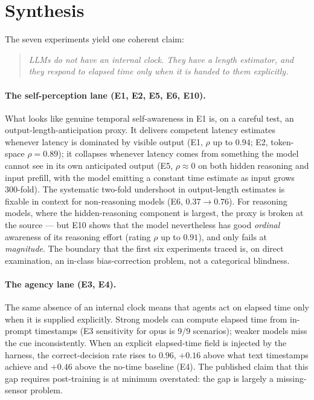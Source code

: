 \documentclass[11pt]{article}
\begin{document}
\section{Synthesis}
\label{sec:synthesis}

The seven experiments yield one coherent claim:

\begin{quote}
\itshape
LLMs do not have an internal clock. They have a length estimator, and they respond to
elapsed time only when it is handed to them explicitly.
\end{quote}

\paragraph{The self-perception lane (E1, E2, E5, E6, E10).} What looks like genuine
temporal self-awareness in E1 is, on a careful test, an output-length-anticipation proxy. It
delivers competent latency estimates whenever latency is dominated by visible output (E1,
$\rho$ up to $0.94$; E2, token-space $\rho = 0.89$); it collapses whenever latency comes from
something the model cannot see in its own anticipated output (E5, $\rho \approx 0$ on both
hidden reasoning and input prefill, with the model emitting a constant time estimate as input
grows $300$-fold). The systematic two-fold undershoot in output-length estimates is fixable in
context for non-reasoning models (E6, $0.37 \to 0.76$). For reasoning models, where the
hidden-reasoning component is largest, the proxy is broken at the source --- but E10 shows
that the model nevertheless has good \emph{ordinal} awareness of its reasoning effort
(rating $\rho$ up to $0.91$), and only fails at \emph{magnitude}. The boundary that the first
six experiments traced is, on direct examination, an in-class bias-correction problem, not a
categorical blindness.

\paragraph{The agency lane (E3, E4).} The same absence of an internal clock means that agents
act on elapsed time only when it is supplied explicitly. Strong models can compute elapsed
time from in-prompt timestamps (E3 sensitivity for opus is $9/9$ scenarios); weaker models
miss the cue inconsistently. When an explicit elapsed-time field is injected by the harness,
the correct-decision rate rises to $0.96$, $+0.16$ above what text timestamps achieve and
$+0.46$ above the no-time baseline (E4). The published claim that this gap requires
post-training \citep{cheng2025temporally} is at minimum overstated: the gap is largely a
missing-sensor problem.
\end{document}
